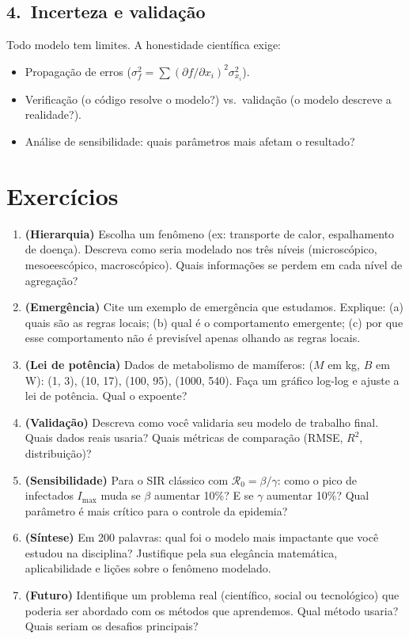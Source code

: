 \documentclass[12pt,a4paper]{article}
\begin{document}
\subsection*{4.\ Incerteza e valida\c{c}\~ao}
Todo modelo tem limites. A honestidade cient\'ifica exige:
\begin{itemize}
  \item Propaga\c{c}\~ao de erros ($\sigma_f^2 = \sum (\partial f/\partial x_i)^2\sigma_{x_i}^2$).
  \item Verifica\c{c}\~ao (o c\'odigo resolve o modelo?) vs.\ valida\c{c}\~ao (o modelo descreve a realidade?).
  \item An\'alise de sensibilidade: quais par\^ametros mais afetam o resultado?
\end{itemize}

\section*{Exerc\'icios}

\begin{enumerate}
  \item \textbf{(Hierarquia)} Escolha um fen\^omeno (ex: transporte de calor, espalhamento de doença). Descreva como seria modelado nos tr\^es n\'iveis (microsc\'opico, mesoeesc\'opico, macrosc\'opico). Quais informa\c{c}\~oes se perdem em cada n\'ivel de agrega\c{c}\~ao?
  
  \item \textbf{(Emerg\^encia)} Cite um exemplo de emerg\^encia que estudamos. Explique: (a) quais s\~ao as regras locais; (b) qual \'e o comportamento emergente; (c) por que esse comportamento n\~ao \'e previs\'ivel apenas olhando as regras locais.
  
  \item \textbf{(Lei de pot\^encia)} Dados de metabolismo de mam\'iferos: ($M$ em kg, $B$ em W): (1, 3), (10, 17), (100, 95), (1000, 540). Fa\c{c}a um gr\'afico log-log e ajuste a lei de pot\^encia. Qual o expoente?
  
  \item \textbf{(Valida\c{c}\~ao)} Descreva como voc\^e validaria seu modelo de trabalho final. Quais dados reais usaria? Quais m\'etricas de compara\c{c}\~ao (RMSE, $R^2$, distribui\c{c}\~ao)?
  
  \item \textbf{(Sensibilidade)} Para o SIR cl\'assico com $\mathcal{R}_0 = \beta/\gamma$: como o pico de infectados $I_\text{max}$ muda se $\beta$ aumentar 10\%? E se $\gamma$ aumentar 10\%? Qual par\^ametro \'e mais cr\'itico para o controle da epidemia?
  
  \item \textbf{(S\'intese)} Em 200 palavras: qual foi o modelo mais impactante que voc\^e estudou na disciplina? Justifique pela sua elegância matem\'atica, aplicabilidade e lições sobre o fen\^omeno modelado.
  
  \item \textbf{(Futuro)} Identifique um problema real (cient\'ifico, social ou tecnol\'ogico) que poderia ser abordado com os m\'etodos que aprendemos. Qual m\'etodo usaria? Quais seriam os desafios principais?
\end{enumerate}
\end{document}
